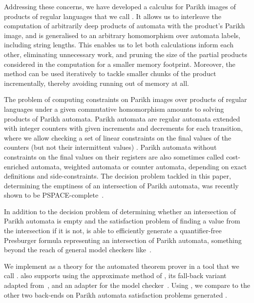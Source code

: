 \documentclass[acmsmall,review,anonymous,screen]{acmart}\settopmatter{printfolios=true,printccs=false,printacmref=true}
\theoremstyle{definition}
\begin{document}
Addressing these concerns, we have developed a calculus for Parikh images of
products of regular languages that we call \Calculus{}. It allows us to
interleave the computation of arbitrarily deep products of automata with the
product's Parikh image, and is generalised to an arbitrary homomorphism over
automata labels, including string lengths. This enables us to let both
calculations inform each other, eliminating unnecessary work, and pruning the
size of the partial products considered in the computation for a smaller memory
footprint. Moreover, the method can be used iteratively to tackle smaller chunks
of the product incrementally, thereby avoiding running out of memory at all.

The problem of computing constraints on Parikh images over products of regular
languages under a given commutative homomorphism amounts to solving products of
Parikh automata. Parikh automata are regular automata extended with integer
counters with given increments and decrements for each transition, where we
allow checking a set of linear constraints on the final values of the counters
(but not their intermittent values) \cite{parikh-automata}. Parikh automata
without constraints on the final values on their registers are also sometimes
called cost-enriched automata, weighted automata or counter automata, depending
on exact definitions and side-constraints. The decision problem tackled in this
paper, determining the emptiness of an intersection of Parikh automata, was
recently shown to be PSPACE-complete~\cite{graph-queries}.

In addition to the decision problem of determining whether an intersection of
Parikh automata is empty and the satisfaction problem of finding a value from
the intersection if it is not, \Catra{} is able to efficiently generate a
quantifier-free Presburger formula representing an intersection of Parikh
automata, something beyond the reach of general model checkers like~\Nuxmv.

We implement \Calculus{} as a theory for the \Princess{} automated theorem
prover in a tool that we call \Catra{}. \Catra also supports using the
approximate method of \cite{approximate-parikh}, its fall-back variant adapted
from~\cite{generate-parikh-image}, and an adapter for the \Nuxmv{} model
checker~\cite{nuxmv}. Using \Catra{}, we compare \Calculus{} to the other two
back-ends on \NrBenchmarks{} Parikh automata satisfaction problems generated
.
\end{document}
